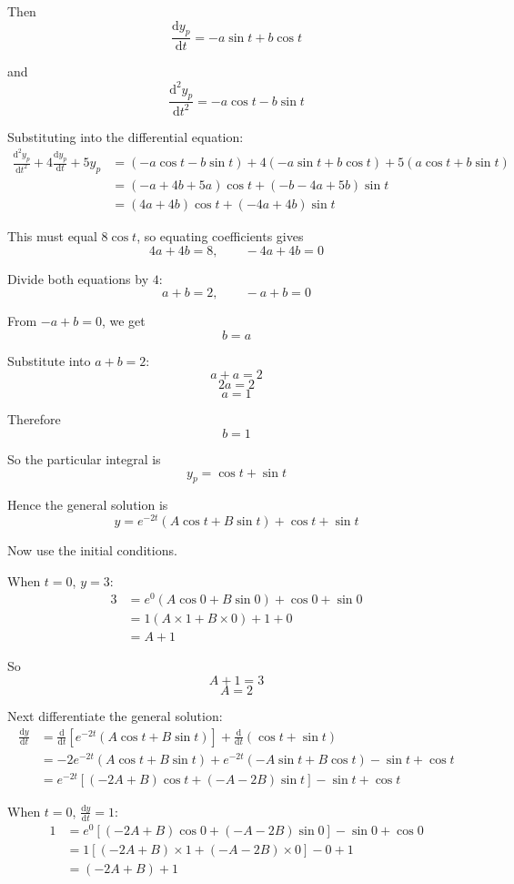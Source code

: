 \documentclass[leqno]{article}
\begin{document}
\begin{enumerate}[
  label=\textbf{\arabic*.},
  leftmargin=*,
  topsep=0pt,
  partopsep=0pt,
  parsep=0pt
]
\begin{djsSolution}
Then
\[
\frac{\mathrm{d}y_p}{\mathrm{d}t}=-a\sin t+b\cos t
\]

and
\[
\frac{\mathrm{d}^2y_p}{\mathrm{d}t^2}=-a\cos t-b\sin t
\]

Substituting into the differential equation:
\begin{align*}
\frac{\mathrm{d}^2y_p}{\mathrm{d}t^2}+4\frac{\mathrm{d}y_p}{\mathrm{d}t}+5y_p
&=(-a\cos t-b\sin t)+4(-a\sin t+b\cos t)+5(a\cos t+b\sin t)\\
&=(-a+4b+5a)\cos t+(-b-4a+5b)\sin t\\
&=(4a+4b)\cos t+(-4a+4b)\sin t
\end{align*}

This must equal \(8\cos t\), so equating coefficients gives
\[
4a+4b=8,\qquad -4a+4b=0
\]

Divide both equations by \(4\):
\[
a+b=2,\qquad -a+b=0
\]

From \(-a+b=0\), we get
\[
b=a
\]

Substitute into \(a+b=2\):
\[
a+a=2
\]
\[
2a=2
\]
\[
a=1
\]

Therefore
\[
b=1
\]

So the particular integral is
\[
y_p=\cos t+\sin t
\]

Hence the general solution is
\[
y=e^{-2t}(A\cos t+B\sin t)+\cos t+\sin t
\]

Now use the initial conditions.

When \(t=0\), \(y=3\):
\begin{align*}
3&=e^{0}(A\cos 0+B\sin 0)+\cos 0+\sin 0\\
&=1(A\times 1+B\times 0)+1+0\\
&=A+1
\end{align*}

So
\[
A+1=3
\]
\[
A=2
\]

Next differentiate the general solution:
\begin{align*}
\frac{\mathrm{d}y}{\mathrm{d}t}
&=\frac{\mathrm{d}}{\mathrm{d}t}\left[e^{-2t}(A\cos t+B\sin t)\right]+\frac{\mathrm{d}}{\mathrm{d}t}(\cos t+\sin t)\\
&=-2e^{-2t}(A\cos t+B\sin t)+e^{-2t}(-A\sin t+B\cos t)-\sin t+\cos t\\
&=e^{-2t}\left[(-2A+B)\cos t+(-A-2B)\sin t\right]-\sin t+\cos t
\end{align*}

When \(t=0\), \(\frac{\mathrm{d}y}{\mathrm{d}t}=1\):
\begin{align*}
1&=e^{0}\left[(-2A+B)\cos 0+(-A-2B)\sin 0\right]-\sin 0+\cos 0\\
&=1\left[(-2A+B)\times 1+(-A-2B)\times 0\right]-0+1\\
&=(-2A+B)+1
\end{align*}


\end{djsSolution}
\end{enumerate}
\end{document}

